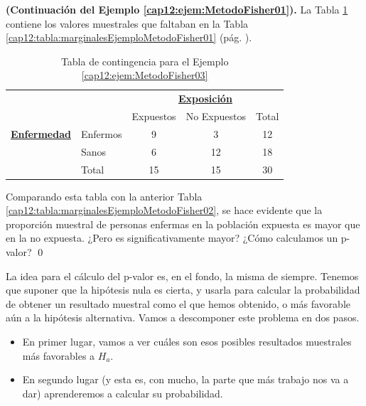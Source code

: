 \begin{ejemplo}
\label{cap12:ejem:MetodoFisher03}
{\bf (Continuación del Ejemplo \ref{cap12:ejem:MetodoFisher01}).}
La Tabla \ref{cap12:tabla:marginalesEjemploMetodoFisher03} contiene los valores muestrales que faltaban en la Tabla \ref{cap12:tabla:marginalesEjemploMetodoFisher01} (pág. \pageref{cap12:tabla:marginalesEjemploMetodoFisher03}).
        \begin{table}[h!]
        \begin{center}
            \begin{tabular}{llccc}
            &&\multicolumn{3}{c}{\underline{\bf Exposición}}\\

                                      &          & Expuestos &  No Expuestos& Total\\
            \cline{2-5}
          \underline{\bf Enfermedad} & Enfermos & 9&  3&   12\\
                                      & Sanos &   6& 12&  18\\
            \cline{2-5}
                                      & Total    & 15& 15& 30\\
            \cline{2-5}
            \end{tabular}
        \end{center}
        \caption{Tabla de contingencia para el Ejemplo \ref{cap12:ejem:MetodoFisher03}}
        \label{cap12:tabla:marginalesEjemploMetodoFisher03}
        \end{table}
Comparando esta tabla con la anterior Tabla \ref{cap12:tabla:marginalesEjemploMetodoFisher02}, se hace evidente que la proporción muestral de personas enfermas en la población expuesta es mayor que en la no expuesta. ¿Pero es significativamente mayor? ¿Cómo calculamos un p-valor?
\qed
\end{ejemplo}
La idea para el cálculo del p-valor es, en el fondo, la misma de siempre. Tenemos que suponer que la hipótesis nula es cierta, y usarla para calcular la probabilidad de obtener un resultado muestral como el que hemos obtenido, o más favorable aún a la hipótesis alternativa. Vamos a descomponer este problema en dos pasos.
\begin{itemize}
  \item En primer lugar, vamos a ver cuáles son esos posibles resultados muestrales más favorables a $H_a$.
  \item En segundo lugar (y esta es, con mucho, la parte que más trabajo nos va a dar) aprenderemos a calcular su probabilidad.
\end{itemize}

